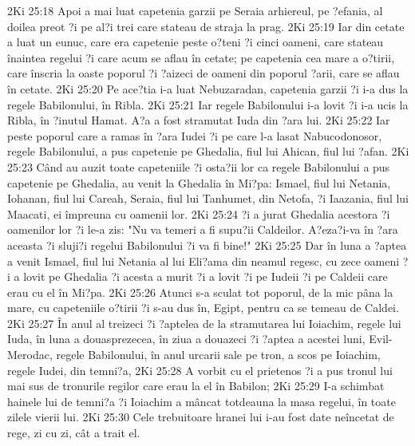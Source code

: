 2Ki 25:18  Apoi a mai luat capetenia garzii pe Seraia arhiereul, pe ?efania, al doilea preot ?i pe al?i trei care stateau de straja la prag.
2Ki 25:19  Iar din cetate a luat un eunuc, care era capetenie peste o?teni ?i cinci oameni, care stateau înaintea regelui ?i care acum se aflau în cetate; pe capetenia cea mare a o?tirii, care înscria la oaste poporul ?i ?aizeci de oameni din poporul ?arii, care se aflau în cetate.
2Ki 25:20  Pe ace?tia i-a luat Nebuzaradan, capetenia garzii ?i i-a dus la regele Babilonului, în Ribla.
2Ki 25:21  Iar regele Babilonului i-a lovit ?i i-a ucis la Ribla, în ?inutul Hamat. A?a a fost stramutat Iuda din ?ara lui.
2Ki 25:22  Iar peste poporul care a ramas în ?ara Iudei ?i pe care l-a lasat Nabucodonosor, regele Babilonului, a pus capetenie pe Ghedalia, fiul lui Ahican, fiul lui ?afan.
2Ki 25:23  Când au auzit toate capeteniile ?i osta?ii lor ca regele Babilonului a pus capetenie pe Ghedalia, au venit la Ghedalia în Mi?pa: Ismael, fiul lui Netania, Iohanan, fiul lui Careah, Seraia, fiul lui Tanhumet, din Netofa, ?i Iaazania, fiul lui Maacati, ei împreuna cu oamenii lor.
2Ki 25:24  ?i a jurat Ghedalia acestora ?i oamenilor lor ?i le-a zis: "Nu va temeri a fi supu?ii Caldeilor. A?eza?i-va în ?ara aceasta ?i sluji?i regelui Babilonului ?i va fi bine!"
2Ki 25:25  Dar în luna a ?aptea a venit Ismael, fiul lui Netania al lui Eli?ama din neamul regesc, cu zece oameni ?i a lovit pe Ghedalia ?i acesta a murit ?i a lovit ?i pe Iudeii ?i pe Caldeii care erau cu el în Mi?pa.
2Ki 25:26  Atunci s-a sculat tot poporul, de la mic pâna la mare, cu capeteniile o?tirii ?i s-au dus în, Egipt, pentru ca se temeau de Caldei.
2Ki 25:27  În anul al treizeci ?i ?aptelea de la stramutarea lui Ioiachim, regele lui Iuda, în luna a douasprezecea, în ziua a douazeci ?i ?aptea a acestei luni, Evil-Merodac, regele Babilonului, în anul urcarii sale pe tron, a scos pe Ioiachim, regele Iudei, din temni?a,
2Ki 25:28  A vorbit cu el prietenos ?i a pus tronul lui mai sus de tronurile regilor care erau la el în Babilon;
2Ki 25:29  I-a schimbat hainele lui de temni?a ?i Ioiachim a mâncat totdeauna la masa regelui, în toate zilele vierii lui.
2Ki 25:30  Cele trebuitoare hranei lui i-au fost date neîncetat de rege, zi cu zi, cât a trait el.


